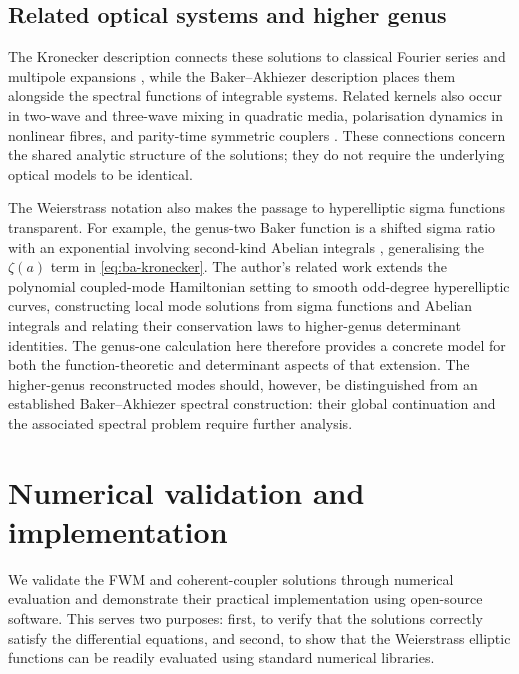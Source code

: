 \documentclass[11pt,a4paper]{article}
\numberwithin{equation}{section}
\begin{document}
\subsection{Related optical systems and higher genus}
The Kronecker description connects these solutions to classical Fourier series \cite{whittakerCourseModernAnalysis2021} and multipole expansions \cite{weilEllipticFunctionsAccording1976,charolloisEllipticFunctionsAccording2016}, while the Baker--Akhiezer description places them alongside the spectral functions of integrable systems.
Related kernels also occur in two-wave and three-wave mixing in quadratic media, polarisation dynamics in nonlinear fibres, and parity-time symmetric couplers \cite{heskethGeneralComplexEnvelope2015}.
These connections concern the shared analytic structure of the solutions; they do not require the underlying optical models to be identical.

The Weierstrass notation also makes the passage to hyperelliptic sigma functions transparent.
For example, the genus-two Baker function is a shifted sigma ratio with an exponential involving second-kind Abelian integrals \cite[Eq.~(3.3)]{bradenBilinearRecurrencesAddition2005}, generalising the $\zeta(a)$ term in \eqref{eq:ba-kronecker}.
The author's related work \cite{zotero-item-855} extends the polynomial coupled-mode Hamiltonian setting to smooth odd-degree hyperelliptic curves, constructing local mode solutions from sigma functions and Abelian integrals and relating their conservation laws to higher-genus determinant identities.
The genus-one calculation here therefore provides a concrete model for both the function-theoretic and determinant aspects of that extension.
The higher-genus reconstructed modes should, however, be distinguished from an established Baker--Akhiezer spectral construction: their global continuation and the associated spectral problem require further analysis.

\section{Numerical validation and implementation} \label{sec:num-val}

We validate the FWM and coherent-coupler solutions through numerical evaluation and demonstrate their practical implementation using open-source software.
This serves two purposes: first, to verify that the solutions correctly satisfy the differential equations, and second, to show that the Weierstrass elliptic functions can be readily evaluated using standard numerical libraries.
\end{document}
